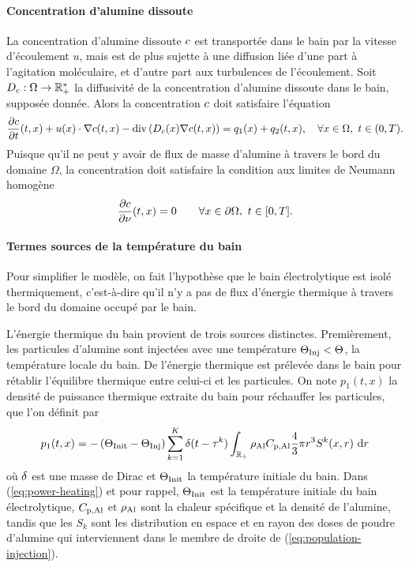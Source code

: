 \paragraph{Concentration d'alumine dissoute}
La concentration d'alumine dissoute $c$ est transportée
dans le bain par la vitesse d'écoulement $u$, mais est de plus sujette
à une diffusion liée d'une part à l'agitation moléculaire, et d'autre
part aux turbulences de l'écoulement. Soit
$D_c:\Omega\to\mathbb R^*_+$ la diffusivité de la
concentration d'alumine dissoute dans le bain, supposée donnée. Alors
la concentration $c$ doit satisfaire l'équation
\begin{equation}\label{eq:concentration}
  \frac{\partial c}{\partial t}(t, x) + u(x)\cdot\nabla c(t, x) - \mathrm{div}\left( D_c(x)
  \nabla c(t, x) \right) = q_1(x) + q_2(t, x),\quad \forall
  x\in\Omega,\ t\in (0, T).
\end{equation}
Puisque qu'il ne peut y avoir de flux de masse d'alumine à travers le
bord du domaine $\Omega$, la concentration doit satisfaire la
condition aux limites de Neumann homogène
\begin{equation}\label{eq:c-bc}
  \frac{\partial c}{\partial \nu}(t, x) = 0 \quad  \quad
  \forall x\in\partial \Omega,\ t\in[0, T].
\end{equation}

\paragraph{Termes sources de la température du bain}
Pour simplifier le modèle, on fait l'hypothèse que le bain
électrolytique est isolé thermiquement, c'est-à-dire qu'il n'y a pas
de flux d'énergie thermique à travers le bord du domaine occupé par le
bain.

L'énergie thermique du bain provient de trois sources
distinctes. Premièrement, les particules d'alumine sont injectées avec
une température $\Theta_\text{Inj} < \Theta$, la température locale du
bain. De l'énergie thermique est prélevée dans le bain pour rétablir
l'équilibre thermique entre celui-ci et les particules. On note $p_1(t,
x)$ la densité de puissance thermique extraite du bain pour réchauffer
les particules, que l'on définit par
\begin{equation}\label{eq:power-heating}
  p_1(t, x) = -\left( \Theta_\text{Init}-\Theta_\text{Inj} \right)\sum_{k = 1}^{K}\delta(t -
  \tau^k)\int_{\mathbb R_+}\rho_\mathrm{Al}C_{\mathrm{p,Al}}\frac{4}{3}\pi r^3 S^k(x, r)\,\,\mathrm dr
\end{equation}
où $\delta$ est une masse de Dirac et $\Theta_\text{Init}$ la température
initiale du bain. Dans (\ref{eq:power-heating}) et pour rappel, $\Theta_\text{Init}$ est la
température initiale du bain électrolytique, $C_{\mathrm{p,Al}}$ et
$\rho_\mathrm{Al}$ sont la chaleur spécifique et la densité de
l'alumine, tandis que les $S_k$ sont les distribution en espace et en
rayon des doses de poudre d'alumine qui interviennent dans le membre
de droite de (\ref{eq:population-injection}).

